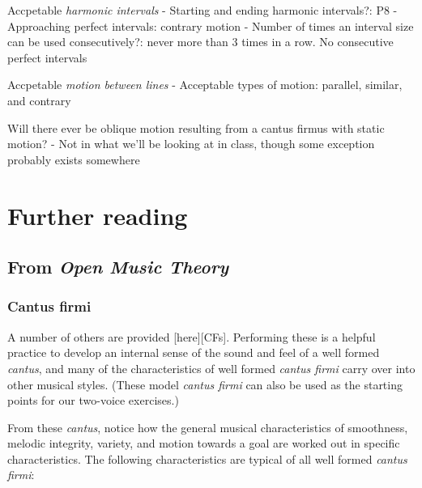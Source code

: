 \documentclass{book}
\begin{document}
Accpetable \emph{harmonic intervals} - Starting and ending harmonic
intervals?: P8 - Approaching perfect intervals: contrary motion - Number of
times an interval size can be used consecutively?: never more than 3 times in
a row. No consecutive perfect intervals

Accpetable \emph{motion between lines} - Acceptable types of motion: parallel,
similar, and contrary

Will there ever be oblique motion resulting from a cantus firmus with static
motion? - Not in what we'll be looking at in class, though some exception
probably exists somewhere

\hypertarget{further-reading-16}{%
\chapter{Further reading}\label{further-reading-16}}

\hypertarget{from-open-music-theory-16}{%
\section{\texorpdfstring{From \emph{Open Music
Theory}}{From Open Music Theory}}\label{from-open-music-theory-16}}

\hypertarget{cantus-firmi}{%
\subsection{Cantus firmi}\label{cantus-firmi}}

A number of others are provided {[}here{]}{[}CFs{]}. Performing these is a
helpful practice to develop an internal sense of the sound and feel of a well
formed \emph{cantus}, and many of the characteristics of well formed
\emph{cantus firmi} carry over into other musical styles. (These model
\emph{cantus firmi} can also be used as the starting points for our two-voice
exercises.)

From these \emph{cantus}, notice how the general musical characteristics of
smoothness, melodic integrity, variety, and motion towards a goal are worked
out in specific characteristics. The following characteristics are typical of
all well formed \emph{cantus firmi}:
\end{document}
